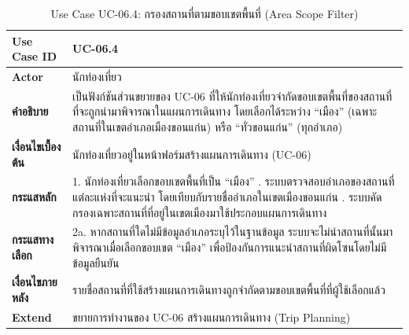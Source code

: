 \begin{table}[H]
\centering
\caption{Use Case UC-06.4: กรองสถานที่ตามขอบเขตพื้นที่ (Area Scope Filter)}
\label{tab:uc06area}
\begin{tabular}{|p{3.2cm}|p{10cm}|}
\hline
\textbf{Use Case ID} & UC-06.4 \\ \hline
\textbf{Actor} & นักท่องเที่ยว \\ \hline
\textbf{คำอธิบาย} & เป็นฟังก์ชันส่วนขยายของ UC-06 ที่ให้นักท่องเที่ยวจำกัดขอบเขตพื้นที่ของสถานที่ที่จะถูกนำมาพิจารณาในแผนการเดินทาง โดยเลือกได้ระหว่าง ``เมือง'' (เฉพาะสถานที่ในเขตอำเภอเมืองขอนแก่น) หรือ ``ทั่วขอนแก่น'' (ทุกอำเภอ) \\ \hline
\textbf{เงื่อนไขเบื้องต้น} & นักท่องเที่ยวอยู่ในหน้าฟอร์มสร้างแผนการเดินทาง (UC-06) \\ \hline
\textbf{กระแสหลัก} & 1. นักท่องเที่ยวเลือกขอบเขตพื้นที่เป็น ``เมือง'' \newline 2. ระบบตรวจสอบอำเภอของสถานที่แต่ละแห่งที่จะแนะนำ โดยเทียบกับรายชื่ออำเภอในเขตเมืองขอนแก่น \newline 3. ระบบคัดกรองเฉพาะสถานที่ที่อยู่ในเขตเมืองมาใช้ประกอบแผนการเดินทาง \\ \hline
\textbf{กระแสทางเลือก} & 2a. หากสถานที่ใดไม่มีข้อมูลอำเภอระบุไว้ในฐานข้อมูล ระบบจะไม่นำสถานที่นั้นมาพิจารณาเมื่อเลือกขอบเขต ``เมือง'' เพื่อป้องกันการแนะนำสถานที่ผิดโซนโดยไม่มีข้อมูลยืนยัน \\ \hline
\textbf{เงื่อนไขภายหลัง} & รายชื่อสถานที่ที่ใช้สร้างแผนการเดินทางถูกจำกัดตามขอบเขตพื้นที่ที่ผู้ใช้เลือกแล้ว \\ \hline
\textbf{Extend} & ขยายการทำงานของ UC-06 สร้างแผนการเดินทาง (Trip Planning) \\
\hline
\end{tabular}
\end{table}

